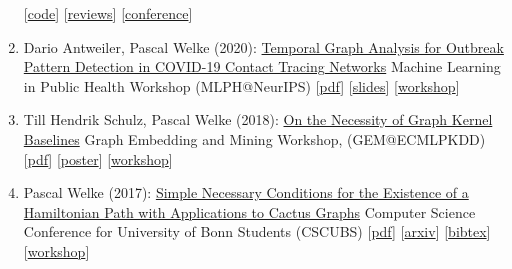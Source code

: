 \documentclass{scrartcl}
\begin{document}
\begin{enumerate}
{[\href{https://github.com/pwelke/homcount}{code}]
[\href{https://openreview.net/forum?id=8GJyW4i2oST}{reviews}]
[\href{http://log2022.logconference.org/}{conference}]
}
\item
\label{antweiler2020temporal}
Dario Antweiler, Pascal Welke (2020):\newline
\href{https://pwelke.github.io/publications/antweiler2020temporal.pdf}{Temporal Graph Analysis for Outbreak Pattern Detection in COVID-19 Contact Tracing Networks}\newline
Machine Learning in Public Health Workshop (MLPH@NeurIPS)\newline
{\footnotesize
[\href{https://pwelke.github.io/publications/antweiler2020temporal.pdf}{pdf}]
[\href{https://pwelke.github.io/publications/antweiler2020temporal-slides.pdf}{slides}]
[\href{https://sites.google.com/nyu.edu/mlph2020/}{workshop}]
}
\item
\label{schulz2018necessity}
Till Hendrik Schulz, Pascal Welke (2018):\newline
\href{https://pwelke.github.io/publications/schulz2018necessity.pdf}{On the Necessity of Graph Kernel Baselines}\newline
Graph Embedding and Mining Workshop, (GEM@ECMLPKDD)\newline
{\footnotesize
[\href{https://pwelke.github.io/publications/schulz2018necessity.pdf}{pdf}]
[\href{https://pwelke.github.io/publications/schulz2018necessity-poster.pdf}{poster}]
[\href{https://gem-ecmlpkdd.github.io/archive/2019/papers/}{workshop}]
}
\item
\label{welke2017necessary}
Pascal Welke (2017):\newline
\href{https://arxiv.org/abs/1709.01367}{Simple Necessary Conditions for the Existence of a Hamiltonian Path
with Applications to Cactus Graphs}\newline
Computer Science Conference for University of Bonn Students (CSCUBS)\newline
{\footnotesize
[\href{https://pwelke.github.io/publications/welke2017necessary.pdf}{pdf}]
[\href{https://arxiv.org/abs/1709.01367}{arxiv}]
[\href{https://dblp.org/rec/journals/corr/abs-1709-01367.bib}{bibtex}]
[\href{http://cscubs.cs.uni-bonn.de/2015/}{workshop}]
}
\seti
\end{enumerate}
\end{document}

